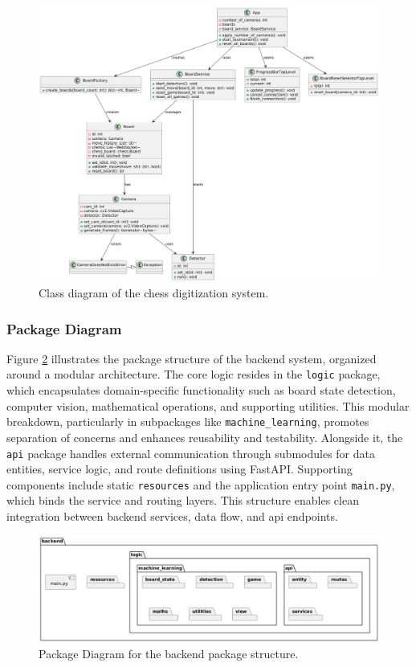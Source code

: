 \begin{figure}[h!]
\centering
\includegraphics[width=0.75\linewidth]{figures/results//uml/class.png}
\caption[Class Diagram]{Class diagram of the chess digitization system.}
\label{fig:class}
\end{figure}

\newpage

\subsubsection*{Package Diagram}

Figure \ref{fig:package-backend} illustrates the package structure of the backend system, organized around a modular architecture. The core logic resides in the \texttt{logic} package, which encapsulates domain-specific functionality such as board state detection, computer vision, mathematical operations, and supporting utilities. This modular breakdown, particularly in subpackages like \texttt{machine\_learning}, promotes separation of concerns and enhances reusability and testability. Alongside it, the \texttt{api} package handles external communication through submodules for data entities, service logic, and route definitions using FastAPI. Supporting components include static \texttt{resources} and the application entry point \texttt{main.py}, which binds the service and routing layers. This structure enables clean integration between backend services, data flow, and \gls{api} endpoints. \\

\begin{figure}[h!]
    \centering
    \includegraphics[width=\linewidth]{figures/results/uml/package-backend.png}
    \caption[Package Diagram for Backend]{Package Diagram for the backend package structure.}
    \label{fig:package-backend}
\end{figure}

